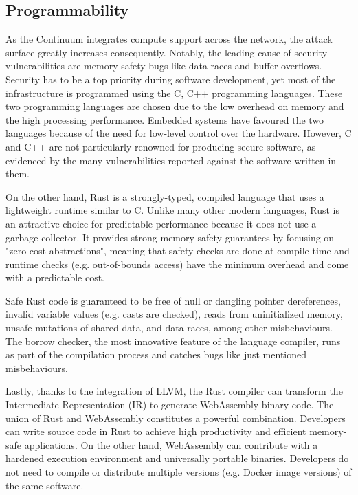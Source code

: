 \subsection{Programmability}

As the Continuum integrates compute support across the network, the attack surface greatly increases consequently. Notably, the leading cause of security vulnerabilities are memory safety bugs like data races and buffer overflows. Security has to be a top priority during software development, yet most of the infrastructure is programmed using the C, C++ programming languages. These two programming languages are chosen due to the low overhead on memory and the high processing performance. Embedded systems have favoured the two languages because of the need for low-level control over the hardware. However, C and C++ are not particularly renowned for producing secure software, as evidenced by the many vulnerabilities reported against the software written in them.

On the other hand, Rust is a strongly-typed, compiled language that uses a lightweight runtime similar to C. Unlike many other modern languages, Rust is an attractive choice for predictable performance because it does not use a garbage collector. It provides strong memory safety guarantees by focusing on "zero-cost abstractions", meaning that safety checks are done at compile-time and runtime checks (e.g. out-of-bounds access) have the minimum overhead and come with a predictable cost.

Safe Rust code is guaranteed to be free of null or dangling pointer dereferences, invalid variable values (e.g. casts are checked), reads from uninitialized memory, unsafe mutations of shared data, and data races, among other misbehaviours. The borrow checker, the most innovative feature of the language compiler, runs as part of the compilation process and catches bugs like just mentioned misbehaviours. 

Lastly, thanks to the integration of LLVM, the Rust compiler can transform the Intermediate Representation (IR) to generate WebAssembly binary code. The union of Rust and WebAssembly constitutes a powerful combination. Developers can write source code in Rust to achieve high productivity and efficient memory-safe applications. On the other hand, WebAssembly can contribute with a hardened execution environment and universally portable binaries. Developers do not need to compile or distribute multiple versions (e.g. Docker image versions) of the same software.

